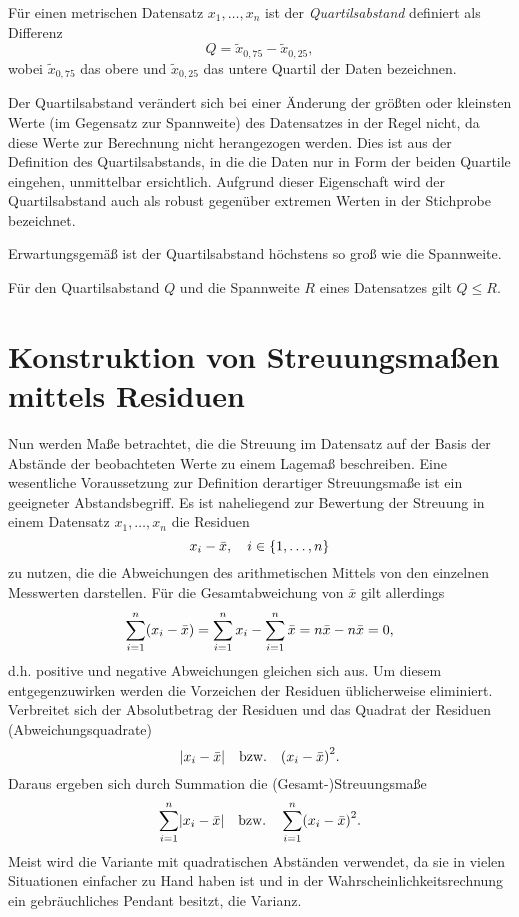 \documentclass{lecture}
\begin{document}
    \begin{definition}
        Für einen metrischen Datensatz \(x_1, \ldots, x_n\) ist der \emph{Quartilsabstand} definiert als Differenz
        \[
            Q = \tilde{x}_{0,75} - \tilde{x}_{0,25},
        \]
        wobei \(\tilde{x}_{0,75}\) das obere und \(\tilde{x}_{0,25}\) das untere Quartil der Daten bezeichnen.
    \end{definition}

    Der Quartilsabstand verändert sich bei einer Änderung der größten oder kleinsten Werte (im Gegensatz zur Spannweite) des Datensatzes in der Regel nicht, da diese Werte zur Berechnung nicht herangezogen werden.
    Dies ist aus der Definition des Quartilsabstands, in die die Daten nur in Form der beiden Quartile eingehen, unmittelbar ersichtlich.
    Aufgrund dieser Eigenschaft wird der Quartilsabstand auch als robust gegenüber extremen Werten in der Stichprobe bezeichnet.

    Erwartungsgemäß ist der Quartilsabstand höchstens so groß wie die Spannweite.

    \begin{calcrule}
        Für den Quartilsabstand \(Q\) und die Spannweite \(R\) eines Datensatzes gilt \(Q \le R\).
    \end{calcrule}


    \section*{Konstruktion von Streuungsmaßen mittels Residuen}

    Nun werden Maße betrachtet, die die Streuung im Datensatz auf der Basis der Abstände der beobachteten Werte zu einem Lagemaß beschreiben.
    Eine wesentliche Voraussetzung zur Definition derartiger Streuungsmaße ist ein geeigneter Abstandsbegriff.
    Es ist naheliegend zur Bewertung der Streuung in einem Datensatz \(x_1, \ldots, x_n\) die Residuen
    \[
        x_i - \bar{x}, \quad i \in \braces*{1, \ldots, n}
    \]
    zu nutzen, die die Abweichungen des arithmetischen Mittels von den einzelnen Messwerten darstellen.
    Für die Gesamtabweichung von \(\bar{x}\) gilt allerdings
    \[
        \sum_{i = 1}^n \parentheses*{x_i - \bar{x}} = \sum_{i = 1}^n x_i - \sum_{i = 1}^n \bar{x} = n\bar{x} - n\bar{x} = 0,
    \]
    d.h. positive und negative Abweichungen gleichen sich aus.
    Um diesem entgegenzuwirken werden die Vorzeichen der Residuen üblicherweise eliminiert.
    Verbreitet sich der Absolutbetrag der Residuen und das Quadrat der Residuen (Abweichungsquadrate)
    \[
        \absolute*{x_i - \bar{x}} \quad \text{bzw.} \quad \parentheses*{x_i - \bar{x}}^2.
    \]
    Daraus ergeben sich durch Summation die (Gesamt-)Streuungsmaße
    \[
        \sum_{i = 1}^n \absolute*{x_i - \bar{x}} \quad \text{bzw.} \quad \sum_{i = 1}^n \parentheses*{x_i - \bar{x}}^2.
    \]
    Meist wird die Variante mit quadratischen Abständen verwendet, da sie in vielen Situationen einfacher zu Hand haben ist und in der Wahrscheinlichkeitsrechnung ein gebräuchliches Pendant besitzt, die Varianz.
\end{document}
